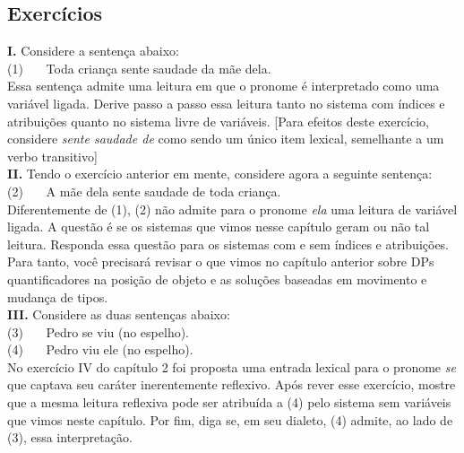 \bigskip

\begin{tcolorbox}[parbox=false,boxrule=0pt,sharp corners,breakable]

\section*{Exercícios}

\n \textbf{I.} Considere a sentença abaixo:\\

\n (1) \ \ \ Toda criança sente saudade da mãe dela.\\

\n Essa sentença admite uma leitura em que o pronome é interpretado como uma variável ligada. Derive passo a passo essa leitura tanto no sistema com índices e atribuições quanto no sistema livre de variáveis. [Para efeitos deste exercício, considere \textit{sente saudade de} como sendo um único item lexical, semelhante a um verbo transitivo] \\

\n \textbf{II.} Tendo o exercício anterior em mente, considere agora a seguinte sentença:\\

\n (2) \ \ \ A mãe dela sente saudade de toda criança.\\

\n Diferentemente de (1), (2) não admite para o pronome \textit{ela} uma leitura de variável ligada. A questão é se os sistemas que vimos nesse capítulo geram ou não tal leitura. Responda essa questão para os sistemas com e sem índices e atribuições. Para tanto, você precisará revisar o que vimos no capítulo anterior sobre DPs quantificadores na posição de objeto e as soluções baseadas em movimento e mudança de tipos.\\

\n \textbf{III.} Considere as duas sentenças abaixo:\\

\n (3) \ \ \ Pedro se viu (no espelho).\\
(4) \ \ \ Pedro viu ele (no espelho). \\

\n No exercício IV do capítulo 2 foi proposta uma entrada lexical para o pronome \textit{se} que captava seu caráter inerentemente reflexivo. Após rever esse exercício, mostre que a mesma leitura reflexiva pode ser atribuída a (4) pelo sistema sem variáveis que vimos neste capítulo. Por fim, diga se, em seu dialeto, (4) admite, ao lado de (3), essa interpretação.

\end{tcolorbox} 

 

